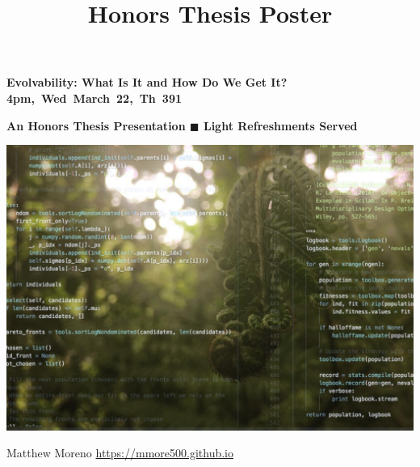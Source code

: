 \documentclass[12pt,letterpaper]{article}
\title{Honors Thesis Poster}
\begin{document}
{\fontsize{40pt}{42pt}\bfseries\selectfont\color{OverleafGreen}%
Evolvability: What Is It and How Do We Get It?%
} \hfill {\LARGE\bfseries%
\mbox{4pm, Wed March 22, Th 391}%
}

\vspace{-2ex}


\begin{large}
\justify
{ \par}

\end{large}

{\LARGE\bfseries An Honors Thesis Presentation \hfill $\blacksquare$ \hfill Light Refreshments Served}\par%

{\centering%
\includegraphics[width=\linewidth]{postergraphic_cropped}%
\par}

\vfill

{\LARGE Matthew Moreno}
\hfill
{\Large \url{https://mmore500.github.io}}
\end{document}
